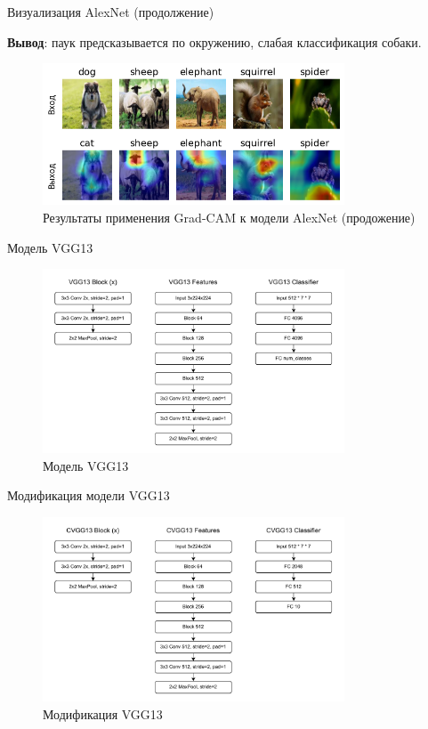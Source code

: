 \documentclass[12pt]{beamer}
\begin{document}
\begin{frame}{Визуализация AlexNet (продолжение)}
    \begin{center}
        \textbf{Вывод}: паук предсказывается по окружению, слабая классификация собаки.
    \end{center}
    \begin{figure}[h]
        \centering
        \includegraphics[width=0.8\textwidth]{images/alexnet_out_2.png}
        \caption{\centering Результаты применения Grad-CAM к модели AlexNet (продожение)}
        \label{fig:alexnet_gradcam_2}
    \end{figure}
\end{frame}

\begin{frame}{Модель VGG13}
    \begin{figure}[ht]
        \centering
        \includegraphics[width=0.8\textwidth]{images/vgg13_model.pdf}
        \caption{Модель VGG13}
        \label{fig:vgg13}
    \end{figure}
\end{frame}

\begin{frame}{Модификация модели VGG13}
    \begin{figure}[ht]
        \centering
        \includegraphics[width=0.8\textwidth]{images/cvgg13_model.pdf}
        \caption{Модификация VGG13}
        \label{fig:cvgg13}
    \end{figure}
\end{frame}
\end{document}
